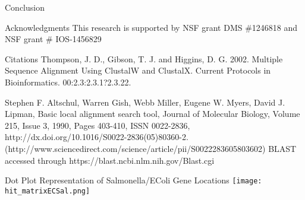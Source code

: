 \documentclass[final]{beamer}
\begin{document}
\begin{frame}{}
\begin{columns}[t]
\begin{column}{.32 \linewidth}
\begin{block}{\large Conclusion}
\begin{itemize}
				\end{itemize}
				
				
				
			\end{block}
			
			
			
			\begin{block}{Acknowledgments}
				This research is supported by NSF grant DMS \#1246818 and NSF grant \# IOS-1456829
			\end{block}
			\begin{block}{Citations}
				\footnotesize
				Thompson, J. D., Gibson, T. J. and Higgins, D. G. 2002. Multiple Sequence Alignment Using ClustalW and ClustalX. Current Protocols in Bioinformatics. 00:2.3:2.3.1?2.3.22.
				
				Stephen F. Altschul, Warren Gish, Webb Miller, Eugene W. Myers, David J. Lipman, Basic local alignment search tool, Journal of Molecular Biology, Volume 215, Issue 3, 1990, Pages 403-410, ISSN 0022-2836, http://dx.doi.org/10.1016/S0022-2836(05)80360-2.
				(http://www.sciencedirect.com/science/article/pii/S0022283605803602)
				BLAST accessed through https://blast.ncbi.nlm.nih.gov/Blast.cgi
				
			\end{block}
			\begin{block}{Dot Plot Representation of Salmonella/EColi Gene Locations}
				\texttt{[image: hit\_matrixECSal.png]}
			\end{block}
			
			
			
		\end{column}
		
	\end{columns}
	
\end{frame}
\end{document}
